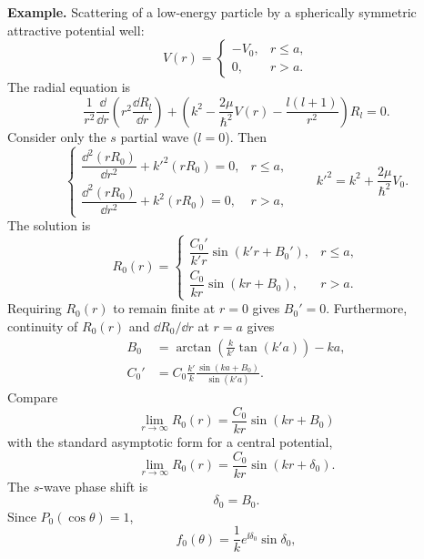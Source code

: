 \textbf{Example.} Scattering of a low-energy particle by a spherically symmetric attractive potential well:
\begin{equation}
V(r)=\begin{cases}-V_0,&r\le a,\\0,&r>a.\end{cases}
\end{equation}
The radial equation is
\begin{equation}
\frac1{r^2}\frac{\dd}{\dd r}\left(r^2\frac{\dd R_l}{\dd r}\right)
+\left(k^2-\frac{2\mu}{\hbar^2}V(r)-\frac{l(l+1)}{r^2}\right)R_l=0.
\end{equation}
Consider only the $s$ partial wave ($l=0$). Then
\begin{equation}
\begin{cases}
\dfrac{\dd^2(rR_0)}{\dd r^2}+k'^2(rR_0)=0,&r\le a,\\[4pt]
\dfrac{\dd^2(rR_0)}{\dd r^2}+k^2(rR_0)=0,&r>a,
\end{cases}
\qquad k'^2=k^2+\frac{2\mu}{\hbar^2}V_0.
\end{equation}
The solution is
\begin{equation}
R_0(r)=\begin{cases}
\dfrac{C_0'}{k'r}\sin(k'r+B_0'),&r\le a,\\[5pt]
\dfrac{C_0}{kr}\sin(kr+B_0),&r>a.
\end{cases}
\end{equation}
Requiring $R_0(r)$ to remain finite at $r=0$ gives $B_0'=0$.
Furthermore, continuity of $R_0(r)$ and $\dd R_0/\dd r$ at $r=a$ gives
\begin{equation}\begin{aligned}
B_0&=\arctan\left(\frac{k}{k'}\tan(k'a)\right)-ka,\\
C_0'&=C_0\frac{k'}{k}\frac{\sin(ka+B_0)}{\sin(k'a)}.
\end{aligned}\end{equation}
Compare
\begin{equation}
\lim_{r\to\infty}R_0(r)=\frac{C_0}{kr}\sin(kr+B_0)
\end{equation}
with the standard asymptotic form for a central potential,
\begin{equation}
\lim_{r\to\infty}R_0(r)=\frac{C_0}{kr}\sin(kr+\delta_0).
\end{equation}
The $s$-wave phase shift is
\begin{equation}
\boxed{\delta_0=B_0}.
\end{equation}
Since $P_0(\cos\theta)=1$,
\begin{equation}
f_0(\theta)=\frac1k e^{\ii\delta_0}\sin\delta_0,
\end{equation}
